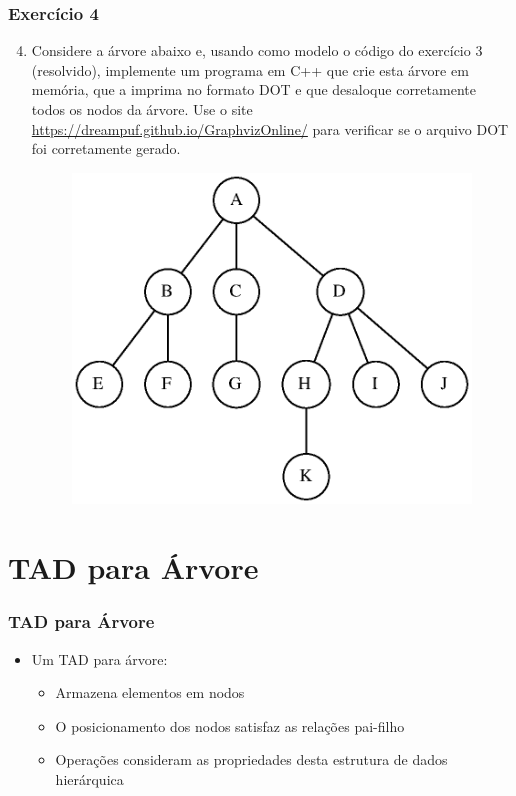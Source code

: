 \documentclass[aspectratio=169]{beamer}
\begin{document}
\begin{frame}[fragile]\frametitle{Exercício 4}
\begin{enumerate}
        \setcounter{enumi}{3}
	\small
	\item Considere a árvore abaixo e, usando como modelo o código do exercício 3 (resolvido), implemente um programa em C++ que crie esta árvore em memória, que a imprima no formato DOT e que desaloque corretamente todos os nodos da árvore. Use o site \url{https://dreampuf.github.io/GraphvizOnline/} para verificar se o arquivo DOT foi corretamente gerado.
\begin{figure}[h]
	\centering
	\includegraphics[height=0.5\paperheight]{imagens/exercicio02.eps}
\end{figure}
\end{enumerate}
\end{frame}

\section{TAD para Árvore}

\begin{frame}\frametitle{TAD para Árvore}
\begin{itemize}
	\item Um TAD para árvore:
	\begin{itemize}
		\item Armazena elementos em nodos
		\item O posicionamento dos nodos satisfaz as relações pai-filho
		\item Operações consideram as propriedades desta estrutura de dados hierárquica
	\end{itemize}
\end{itemize}
\end{frame}
\end{document}
